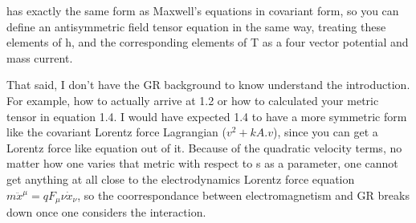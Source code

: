 \documentclass{article}
\begin{document}
has exactly the same form as Maxwell's equations in covariant form, so you can define an antisymmetric field tensor equation in the same way, treating these elements of h, and the corresponding elements of T as a four vector potential and mass current.

That said, I don't have the GR background to know understand the introduction.  For example, how to actually arrive at 1.2
or how to calculated your metric tensor in equation 1.4.  I would have expected 1.4 to have a more symmetric form like the covariant Lorentz force Lagrangian ($v^2 + kA.v$), since you can get a Lorentz force like equation out of it.  Because of the quadratic velocity terms, no matter how one varies that metric with respect to s as a parameter, one cannot get anything at all close to the electrodynamics Lorentz force equation $m\ddot{x}^\mu = q F_\mu\nu \dot{x}_\nu$, so the coorrespondance between electromagnetism and GR breaks down once one considers the interaction.



\end{document}
